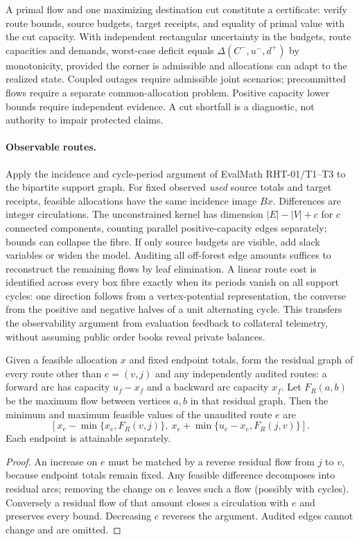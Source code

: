 A primal flow and one maximizing destination cut constitute a certificate: verify route bounds, source budgets, target receipts, and equality of primal value with the cut capacity. With independent rectangular uncertainty in the budgets, route capacities and demands, worst-case deficit equals $\Delta(C^-,u^-,d^+)$ by monotonicity, provided the corner is admissible and allocations can adapt to the realized state. Coupled outages require admissible joint scenarios; precommitted flows require a separate common-allocation problem. Positive capacity lower bounds require independent evidence. A cut shortfall is a diagnostic, not authority to impair protected claims.

\paragraph{Observable routes.} Apply the incidence and cycle-period argument of EvalMath RHT-01/T1--T3 to the bipartite support graph. For fixed observed \emph{used} source totals and target receipts, feasible allocations have the same incidence image $Bx$. Differences are integer circulations. The unconstrained kernel has dimension $|E|-|V|+c$ for $c$ connected components, counting parallel positive-capacity edges separately; bounds can collapse the fibre. If only source budgets are visible, add slack variables or widen the model. Auditing all off-forest edge amounts suffices to reconstruct the remaining flows by leaf elimination. A linear route cost is identified across every box fibre exactly when its periods vanish on all support cycles: one direction follows from a vertex-potential representation, the converse from the positive and negative halves of a unit alternating cycle. This transfers the observability argument from evaluation feedback to collateral telemetry, without assuming public order books reveal private balances.

\begin{proposition}
\label{prop:shz-route-range}
Given a feasible allocation $x$ and fixed endpoint totals, form the residual graph of every route other than $e=(v,j)$ and any independently audited routes: a forward arc has capacity $u_f-x_f$ and a backward arc capacity $x_f$. Let $F_R(a,b)$ be the maximum flow between vertices $a,b$ in that residual graph. Then the minimum and maximum feasible values of the unaudited route $e$ are
\[
 \left[x_e-\min\{x_e,F_R(v,j)\},\
 x_e+\min\{u_e-x_e,F_R(j,v)\}\right].
\]
Each endpoint is attainable separately.
\end{proposition}
\begin{proof}
An increase on $e$ must be matched by a reverse residual flow from $j$ to $v$, because endpoint totals remain fixed. Any feasible difference decomposes into residual arcs; removing the change on $e$ leaves such a flow (possibly with cycles). Conversely a residual flow of that amount closes a circulation with $e$ and preserves every bound. Decreasing $e$ reverses the argument. Audited edges cannot change and are omitted.
\end{proof}

